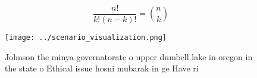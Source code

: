 \documentclass[a4paper]{article}
\begin{document}
\[ \frac{n!}{k!(n-k)!} = \binom{n}{k} \]

\begin{figure}
\centering
\texttt{[image: ../scenario\_visualization.png]}
\caption{Johnson the minya governatorate o upper dumbell lake in oregon in the state o Ethical issue hosni mubarak in ge Have ri
}
\end{figure}
 
\end{document}
